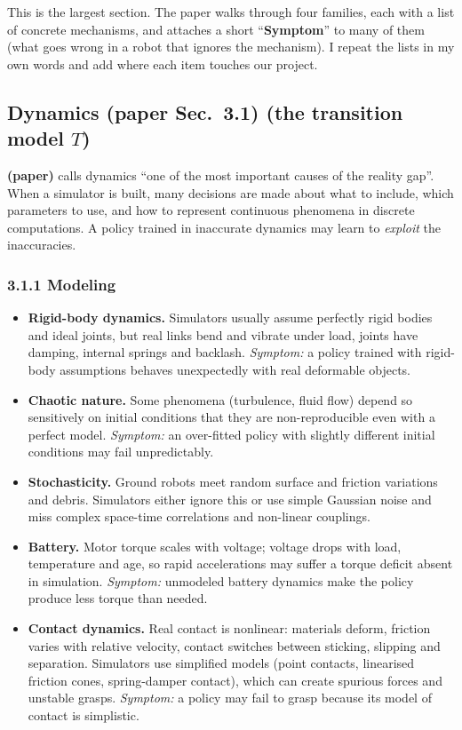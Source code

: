 \documentclass[11pt,a4paper]{article}
\begin{document}
This is the largest section. The paper walks through four families, each with a list of concrete
mechanisms, and attaches a short ``\textbf{Symptom}'' to many of them (what goes wrong in a robot
that ignores the mechanism). I repeat the lists in my own words and add where each item touches
our project.

\subsection{Dynamics \textnormal{(paper Sec.~3.1)} \textnormal{(the transition model $T$)}}
\textbf{(paper)} calls dynamics ``one of the most important causes of the reality gap''. When a
simulator is built, many decisions are made about what to include, which parameters to use, and
how to represent continuous phenomena in discrete computations. A policy trained in inaccurate
dynamics may learn to \emph{exploit} the inaccuracies.

\subsubsection*{3.1.1 Modeling}
\begin{itemize}
\item \textbf{Rigid-body dynamics.} Simulators usually assume perfectly rigid bodies and ideal
joints, but real links bend and vibrate under load, joints have damping, internal springs and
backlash. \emph{Symptom:} a policy trained with rigid-body assumptions behaves unexpectedly with
real deformable objects.
\item \textbf{Chaotic nature.} Some phenomena (turbulence, fluid flow) depend so sensitively on
initial conditions that they are non-reproducible even with a perfect model. \emph{Symptom:} an
over-fitted policy with slightly different initial conditions may fail unpredictably.
\item \textbf{Stochasticity.} Ground robots meet random surface and friction variations and
debris. Simulators either ignore this or use simple Gaussian noise and miss complex space-time
correlations and non-linear couplings.
\item \textbf{Battery.} Motor torque scales with voltage; voltage drops with load, temperature and
age, so rapid accelerations may suffer a torque deficit absent in simulation. \emph{Symptom:}
unmodeled battery dynamics make the policy produce less torque than needed.
\item \textbf{Contact dynamics.} Real contact is nonlinear: materials deform, friction varies with
relative velocity, contact switches between sticking, slipping and separation. Simulators use
simplified models (point contacts, linearised friction cones, spring-damper contact), which can
create spurious forces and unstable grasps. \emph{Symptom:} a policy may fail to grasp because its
model of contact is simplistic.
\end{itemize}
\end{document}
